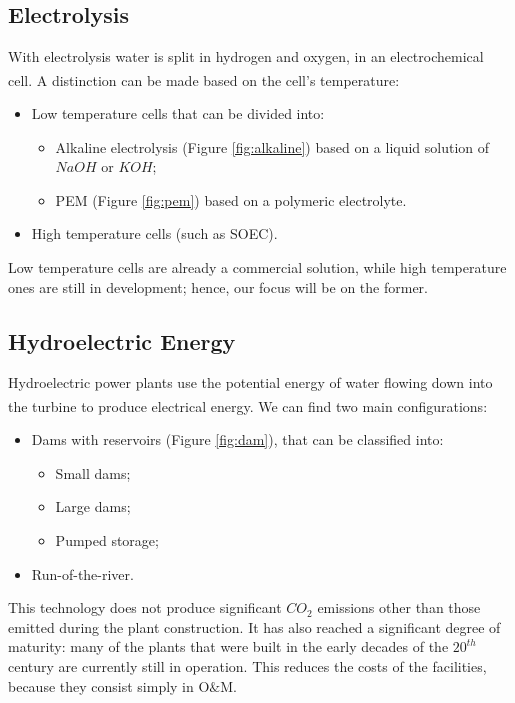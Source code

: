 \subsection{Electrolysis}
With electrolysis water is split in hydrogen and oxygen, in an electrochemical cell. A distinction can be made based on the cell's temperature\textsuperscript{\cite{guanda20211}}:

\begin{itemize}
    \item Low temperature cells that can be divided into:
    \begin{itemize}
        \item Alkaline electrolysis (Figure \ref{fig:alkaline})  based on a liquid solution of $NaOH$ or $KOH$;
        \item PEM (Figure \ref{fig:pem}) based on a polymeric electrolyte.
    \end{itemize}
    \item High temperature cells (such as SOEC).
\end{itemize}

Low temperature cells are already a commercial solution, while high temperature ones are still in development; hence, our focus will be on the former.

\subsection{Hydroelectric Energy}
Hydroelectric power plants use the potential energy of water flowing down into the turbine to produce electrical energy. We can find two main configurations\textsuperscript{\cite{lakohydro2010}}:

\begin{itemize}
    \item Dams with reservoirs (Figure \ref{fig:dam}), that can be classified into:
    \begin{itemize}
        \item Small dams;
        \item Large dams;
        \item Pumped storage;
    \end{itemize}
    \item Run-of-the-river.
\end{itemize}

This technology does not produce significant $CO_2$ emissions other than those emitted during the plant construction. It has also reached a significant degree of maturity: many of the plants that were built in the early decades of the $20^{th}$ century are currently still in operation. This reduces the costs of the facilities, because they consist simply in O$\&$M.


